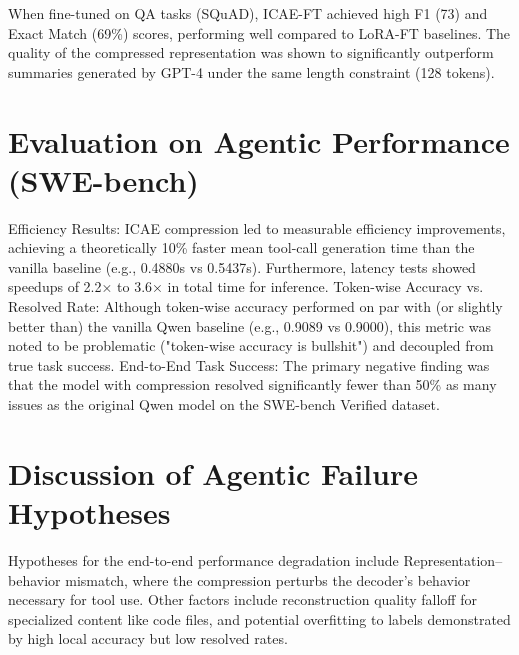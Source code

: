 When fine-tuned on QA tasks (SQuAD), ICAE-FT achieved high F1 (73) and Exact Match (69\%) scores, performing well compared to LoRA-FT baselines. The quality of the compressed representation was shown to significantly outperform summaries generated by GPT-4 under the same length constraint (128 tokens).


\section{Evaluation on Agentic Performance (SWE-bench)}

Efficiency Results: ICAE compression led to measurable efficiency improvements, achieving a theoretically 10\% faster mean tool-call generation time than the vanilla baseline (e.g., 0.4880s vs 0.5437s). Furthermore, latency tests showed speedups of 2.2× to 3.6× in total time for inference. Token-wise Accuracy vs. Resolved Rate: Although token-wise accuracy performed on par with (or slightly better than) the vanilla Qwen baseline (e.g., 0.9089 vs 0.9000), this metric was noted to be problematic ("token-wise accuracy is bullshit") and decoupled from true task success. End-to-End Task Success: The primary negative finding was that the model with compression resolved significantly fewer than 50\% as many issues as the original Qwen model on the SWE-bench Verified dataset.


\section{Discussion of Agentic Failure Hypotheses}

Hypotheses for the end-to-end performance degradation include Representation–behavior mismatch, where the compression perturbs the decoder's behavior necessary for tool use. Other factors include reconstruction quality falloff for specialized content like code files, and potential overfitting to labels demonstrated by high local accuracy but low resolved rates.
